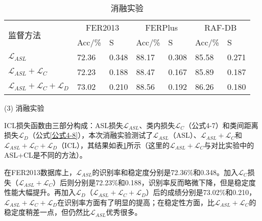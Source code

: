 \begin{table}[!ht]
	\caption{消融实验}
	\centering
	\renewcommand{\arraystretch}{1.5}
	\label{表4.5}
	\begin{tabular}{p{2.75cm}<{\centering}p{1.25cm}<{\centering}p{1.25cm}<{\centering}p{1.25cm}<{\centering}p{1.25cm}<{\centering}p{1.25cm}<{\centering}p{1.25cm}}
		\bottomrule
		\multirow{2}{*}{监督方法}                                                                                 & \multicolumn{2}{c}{FER2013} & \multicolumn{2}{c}{FERPlus} & \multicolumn{2}{c}{RAF-DB} \\ \cline{2-7} 
		& Acc/\%        & S           & Acc/\%        & S           & Acc/\%       & S           \\ \hline
		$\mathcal{L}_{ASL}$                                                               & 72.36         & 0.348       & 88.17         & 0.308       & 85.58        & 0.271       \\
		$\mathcal{L}_{ASL}+\mathcal{L}_C$                                & 72.23         & 0.188       & 88.47         & 0.167       & 85.89        & 0.187       \\
		$\mathcal{L}_{ASL}+\mathcal{L}_C+\mathcal{L}_D$ 				 & 73.02         & 0.210       & 88.56         & 0.192       & 86.26        & 0.180       \\ \bottomrule
	\end{tabular}
\end{table}


(3)	消融实验

ICL损失函数由三部分构成：ASL损失$\mathcal{L}_{ASL}$、类内损失$\mathcal{L}_C$（公式4-7）和类间距离损失$\mathcal{L}_D$（公式\ref{公式4-8}），本次消融实验测试了$\mathcal{L}_{ASL}$（ASL）、$\mathcal{L}_{ASL}+\mathcal{L}_C$和$\mathcal{L}_{ASL}+\mathcal{L}_C+\mathcal{L}_D$（ICL），其结果如表\ref{表4.5}所示（这里的$\mathcal{L}_{ASL}+\mathcal{L}_C$与对比实验中的ASL+CL是不同的方法）。


在FER2013数据库上，$\mathcal{L}_{ASL}$的识别率和稳定度分别是72.36\%和0.348。加入$\mathcal{L}_C$损失（$\mathcal{L}_{ASL}+\mathcal{L}_C$）后则分别是72.23\%和0.188，识别率反而略微下降，但是稳定度性能大幅提升。再加入$\mathcal{L}_D$（$\mathcal{L}_{ASL}+\mathcal{L}_C+\mathcal{L}_D$）后的成绩分别是73.02\%和0.210，$\mathcal{L}_{ASL}+\mathcal{L}_C+\mathcal{L}_D$在识别率方面有了明显的提高；在稳定性方面，比$\mathcal{L}_{ASL}+\mathcal{L}_C$的稳定度稍差一点，但仍然比$\mathcal{L}_{ASL}$优秀很多。

